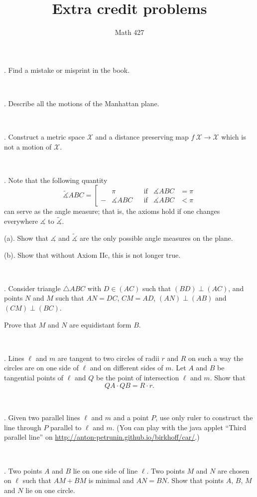 \documentclass[oneside,a4paper]{article}
\begin{document}
\title{Extra credit problems}
\author{Math 427}
\date{}
\maketitle

\textit{}

. Find a mistake or misprint in the book.

\ 

. Describe all the motions of the Manhattan plane.

\ 

. Construct a metric space $\mathcal X$ and a distance preserving map $f\:\mathcal X\to \mathcal X$ which is not a motion of $\mathcal X$.

\ 

. Note that the following quantity 
$$\tilde
\measuredangle ABC=\left[
\begin{aligned}
&\pi&&\text{if}&\measuredangle ABC&=\pi
\\
-&\measuredangle ABC&&\text{if}&\measuredangle ABC&<\pi
\end{aligned}
\right.$$
can serve as the angle measure; 
that is, the axioms hold if one changes everywhere $\measuredangle$ to $\tilde\measuredangle$.

\noi (a). Show that $\measuredangle$ and $\tilde\measuredangle$ are the only possible angle measures on the plane. 

\noi (b). Show that without Axiom IIc, this is not longer true.

\ 

. Consider triangle $\triangle A B C$ with $D\in (A C)$ such that $(BD)\perp (AC)$, and points $N$ and $M$ such that $AN=DC$, $CM=AD$, $(AN)\perp(AB)$ and $(CM)\perp(BC)$.

Prove that $M$ and $N$ are equidistant form $B$.

\ 

.  Lines $\ell$ and $m$ are tangent to two circles of radii $r$ and $R$ on such
a way the circles are on one side of $\ell$ and on different sides of $m$. 
Let $A$ and $B$ be
tangential points of $\ell$ and $Q$ be the point of intersection $\ell$ and $m$. 
Show that
$$QA\cdot QB = R\cdot r.$$

\ 

. Given two parallel lines $\ell$ and $m$ and a point $P$, use only ruler to construct the line through $P$ parallel to $\ell$ and $m$.
(You can play with the java applet ``Third parallel line'' on  \href{http://anton-petrunin.github.io/birkhoff/car/}{http://anton-petrunin.github.io/birkhoff/car/}.)


\ 

. Two points $A$ and $B$ lie on one side of line $\ell$. 
Two points $M$ and $N$ are chosen on $\ell$ such that $AM + BM$ is minimal and $AN = BN$. 
Show that points $A$, $B$, $M$ and $N$ lie on one circle.
\end{document}
